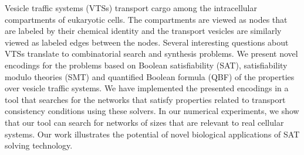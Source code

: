 Vesicle traffic systems (VTSs) transport cargo among the intracellular compartments of eukaryotic cells.
%
The compartments are viewed as nodes that are labeled by their chemical identity and the transport vesicles are similarly viewed as labeled edges between the nodes.
%
Several interesting questions about VTSs translate to combinatorial search and synthesis problems. 
%
We present novel encodings for the problems
based on Boolean satisfiability (SAT), satisfiability modulo theories (SMT) and
quantified Boolean formula (QBF) of the properties over vesicle traffic systems.
%
We have implemented the presented encodings in a tool that searches for the networks that satisfy properties related to transport consistency conditions using these solvers. 
%
In our numerical experiments, we show that our tool can search for networks of sizes that are relevant to real cellular systems.
%
Our work illustrates the potential of novel biological applications of
SAT solving technology.

%
%
%

